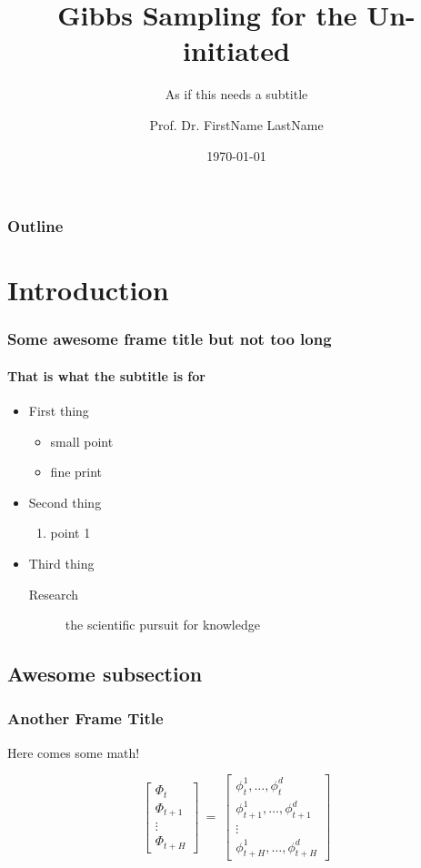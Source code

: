 \documentclass{beamer}
\title{Gibbs Sampling for the Un-initiated}
\subtitle{As if this needs a subtitle}
\author{Prof. Dr. FirstName LastName}
\date{\today}
\institute{\url{email@some-cool-place.ext}\\\url{http://www.cool-url.com}}
\begin{document}
\begin{frame}[plain,t]
\titlepage
\end{frame}

\begin{frame}%
	\frametitle{Outline}
\tableofcontents
\end{frame}


\section{Introduction}
\begin{frame}
\frametitle{Some awesome frame title but not too long}
\framesubtitle{That is what the subtitle is for}
\begin{itemize}
\item First thing
	\begin{itemize}
	\item small point
	\item fine print
	\end{itemize}
\item Second thing
	\begin{enumerate}
	\item point 1
	\end{enumerate}
\item Third thing
	\begin{description}
	\item[Research] the scientific pursuit for knowledge
	\end{description}
\end{itemize}
\end{frame}

\subsection{Awesome subsection}
\begin{frame}
	\frametitle{Another Frame Title}

	Here comes some math!

	\begin{equation}

		\begin{bmatrix}
	        \Phi_t \\
	        \Phi_{t+1} \\
	        \vdots \\
	        \Phi_{t+H}
	    \end{bmatrix}
	    ~=~
	    \begin{bmatrix}
	        \phi_t^1, \ldots, \phi_t^d \\
	        \phi_{t+1}^1, \ldots, \phi_{t+1}^d \\
	        \vdots \\
	        \phi_{t+H}^1, \ldots, \phi_{t+H}^d
	    \end{bmatrix}

		\label{eq:random}
	\end{equation}

\end{frame}
\end{document}
